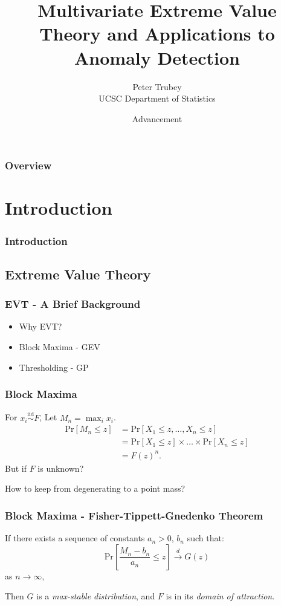\documentclass[aspectratio=169]{beamer}
\title{Multivariate Extreme Value Theory and Applications to Anomaly Detection}
\author{Peter Trubey \\ UCSC Department of Statistics}
\date[8/25/2021]{Advancement}
\begin{document}
\begin{frame}
  \titlepage
\end{frame}

\begin{frame}
  \frametitle{Overview}
  \tableofcontents
\end{frame}

\section{Introduction}

\begin{frame}
  \frametitle{Introduction}


\end{frame}



\subsection{Extreme Value Theory}

\begin{frame}
  \frametitle{EVT - A Brief Background}
  \begin{itemize}
    \item Why EVT?
    \item Block Maxima - GEV
    \item Thresholding - GP
  \end{itemize}
\end{frame}

\begin{frame}
  \frametitle{Block Maxima}
  For $x_i \stackrel{\text{iid}}{\sim} F$, Let $M_n = \max_{i} x_i$.
  \begin{equation*}
    \begin{aligned}
      \text{Pr}\left[M_n\leq z\right] &= \text{Pr}\left[X_1 \leq z, \ldots, X_n \leq z\right]\\
        &= \text{Pr}\left[X_1\leq z\right]\times\ldots\times\text{Pr}\left[X_n\leq z\right]\\
        &= F(z)^n.
    \end{aligned}
  \end{equation*}
  But if $F$ is unknown?

  How to keep from degenerating to a point mass?
\end{frame}

\begin{frame}
  \frametitle{Block Maxima - Fisher-Tippett-Gnedenko Theorem}
  If there exists a sequence of constants $a_n > 0$, $b_n$ such that:
  \begin{equation*}
    \text{Pr}\left[\frac{M_n - b_n}{a_n} \leq z\right] \stackrel{d}{\rightarrow} G(z)
  \end{equation*}
  as $n\to\infty$,

  Then $G$ is a \emph{max-stable distribution}, and $F$ is in its \emph{domain of attraction}.
\end{frame}
\end{document}
